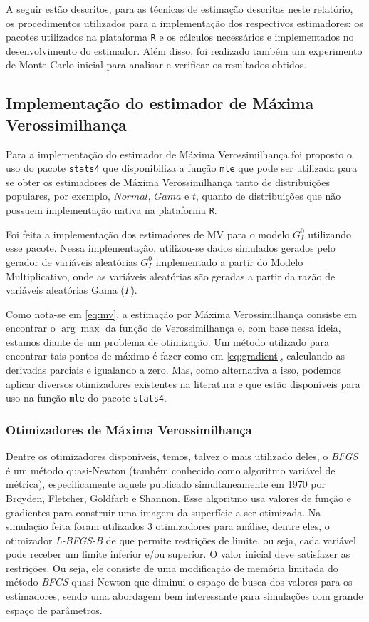 \documentclass[12pt]{article}
\begin{document}
A seguir estão descritos, para as técnicas de estimação descritas neste relatório, os procedimentos utilizados para a implementação dos respectivos estimadores: os pacotes utilizados na plataforma \texttt{R} e os cálculos necessários e implementados no desenvolvimento do estimador. Além disso, foi realizado também um experimento de Monte Carlo inicial para analisar e verificar os resultados obtidos.

\subsection{Implementação do estimador de Máxima Verossimilhança}

Para a implementação do estimador de Máxima Verossimilhança foi proposto o uso do pacote \texttt{stats4} que disponibiliza a função \texttt{mle} que pode ser utilizada para se obter os estimadores de Máxima Verossimilhança tanto de distribuições populares, por exemplo, $Normal$, $Gama$ e $t$, quanto de distribuições que não possuem implementação nativa na plataforma \texttt{R}.

Foi feita a implementação dos estimadores de MV para o modelo $G_I^0$ utilizando esse pacote. Nessa implementação, utilizou-se dados simulados gerados pelo gerador de variáveis aleatórias $G_I^0$ implementado a partir do Modelo Multiplicativo, onde as variáveis aleatórias são geradas a partir da razão de variáveis aleatórias Gama ($\Gamma$).

Como nota-se em \eqref{eq:mv}, a estimação por Máxima Verossimilhança consiste em encontrar o $\arg\max$ da função de Verossimilhança e, com base nessa ideia, estamos diante de um problema de otimização. Um método utilizado para encontrar tais pontos de máximo é fazer como em \eqref{eq:gradient}, calculando as derivadas parciais e igualando a zero. Mas, como alternativa a isso, podemos aplicar diversos otimizadores existentes na literatura e que estão disponíveis para uso na função \texttt{mle} do pacote \texttt{stats4}.

\subsubsection{Otimizadores de Máxima Verossimilhança}

Dentre os otimizadores disponíveis, temos, talvez o mais utilizado deles, o \emph{BFGS} é um método quasi-Newton (também conhecido como algoritmo variável de métrica), especificamente aquele publicado simultaneamente em 1970 por Broyden, Fletcher, Goldfarb e Shannon. Esse algoritmo usa valores de função e gradientes para construir uma imagem da superfície a ser otimizada. Na simulação feita foram utilizados 3 otimizadores para análise, dentre eles, o otimizador \emph{L-BFGS-B} de \citet{Byrd_1995} que permite restrições de limite, ou seja, cada variável pode receber um limite inferior e/ou superior. O valor inicial deve satisfazer as restrições. Ou seja, ele consiste de uma modificação de memória limitada do método \emph{BFGS} quasi-Newton que diminui o espaço de busca dos valores para os estimadores, sendo uma abordagem bem interessante para simulações com grande espaço de parâmetros.
\end{document}
